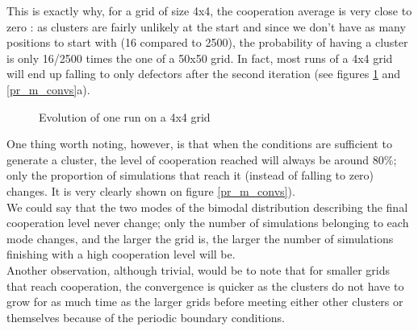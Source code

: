 \documentclass[a4paper]{article}
\begin{document}
This is exactly why, for a grid of size 4x4, the cooperation average is 
very close to zero : as clusters are fairly unlikely at the start and since
we don't have as many positions to start with (16 compared to 2500), the
probability of having a cluster is only 16/2500 times the one of a 50x50
grid. In fact, most runs of a 4x4 grid will end up falling to only defectors
after the second iteration (see figures \ref{4viz} and \ref{pr_m_convs}a).\\

\begin{figure}[H]
	\centering
	\caption{Evolution of one run on a 4x4 grid}
	\label{4viz}
\end{figure}

One thing worth noting, however, is that when the conditions are sufficient to
generate a cluster, the level of cooperation reached will always be around
80\%; only the proportion of simulations that reach it (instead of falling to
zero) changes. It is very clearly shown on figure \ref{pr_m_convs}).\\

We could say that the two modes of the bimodal distribution describing the 
final cooperation level never change; only the number of simulations belonging
to each mode changes, and the larger the grid is, the larger the number of 
simulations finishing with a high cooperation level will be.\\

Another observation, although trivial, would be to note that for smaller grids
that reach cooperation, the convergence is quicker as the clusters do not have
to grow for as much time as the larger grids before meeting either other
clusters or themselves because of the periodic boundary conditions.
\end{document}
